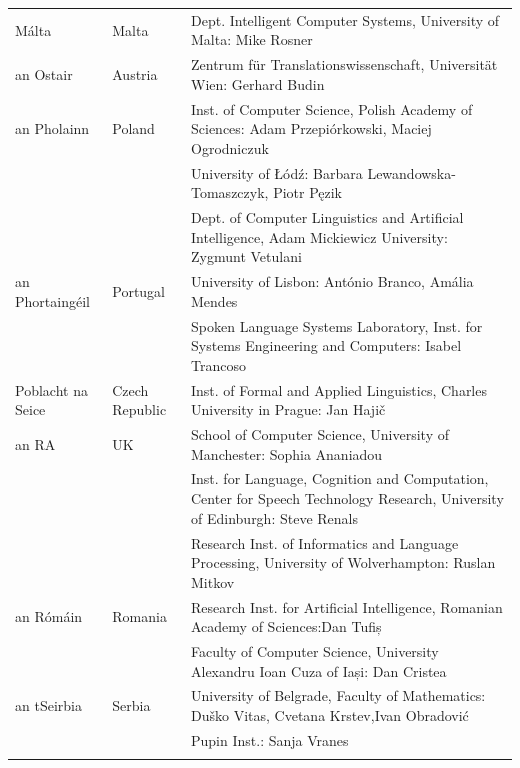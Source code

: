 \begin{longtable}{@{}llp{113mm}@{}}
  Málta & \textcolor{grey1}{Malta} & Dept. Intelligent Computer Systems, University of Malta: Mike Rosner\\ \addlinespace
  
  an Ostair & \textcolor{grey1}{Austria} & Zentrum für Translationswissenschaft, Universität Wien: Gerhard Budin\\ \addlinespace
   
  an Pholainn & \textcolor{grey1}{Poland} & Inst. of Computer Science, Polish Academy of Sciences: Adam Przepiórkowski, Maciej Ogrodniczuk \\ \addlinespace
  & & University of Łódź: Barbara Lewandowska-Tomaszczyk, Piotr Pęzik\\ \addlinespace
  & & Dept. of Computer Linguistics and Artificial Intelligence, Adam Mickiewicz University: Zygmunt Vetulani \\ \addlinespace
  
  an Phortaingéil & \textcolor{grey1}{Portugal} & University of Lisbon: António Branco, Amália Mendes \\ \addlinespace
  & & Spoken Language Systems Laboratory, Inst. for Systems Engineering and Computers: Isabel Trancoso \\ \addlinespace
  
  Poblacht na Seice & \textcolor{grey1}{Czech Republic} & Inst. of Formal and Applied Linguistics, Charles University in Prague: Jan Hajič \\ \addlinespace
  
  an RA & \textcolor{grey1}{UK} &   School of Computer Science, University of Manchester: Sophia Ananiadou \\ \addlinespace 
  & & Inst. for Language, Cognition and Computation, Center for Speech Technology Research, University of Edinburgh: Steve Renals \\ \addlinespace 
  & & Research Inst. of Informatics and Language Processing, University of Wolverhampton: Ruslan Mitkov \\ \addlinespace
  
  an Rómáin & \textcolor{grey1}{Romania} & Research Inst. for Artificial Intelligence, Romanian Academy of Sciences:\newline Dan Tufiș \\ \addlinespace
  & & Faculty of Computer Science, University Alexandru Ioan Cuza of Iași: Dan Cristea \\ \addlinespace
  
  an tSeirbia & \textcolor{grey1}{Serbia} & University of Belgrade, Faculty of Mathematics: Duško Vitas, Cvetana Krstev,\newline Ivan Obradović \\ \addlinespace
  & & Pupin Inst.: Sanja Vranes \\ \addlinespace
    

\end{longtable}
